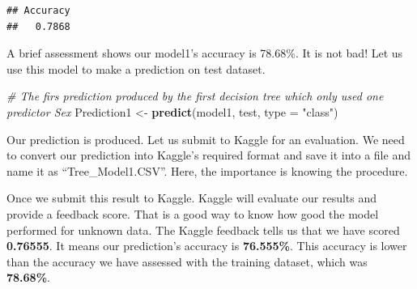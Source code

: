 \documentclass[
]{book}
\newenvironment{Shaded}{\begin{snugshade}}{\end{snugshade}}
\newcommand{\CommentTok}[1]{\textcolor[rgb]{0.56,0.35,0.01}{\textit{#1}}}
\newcommand{\DataTypeTok}[1]{\textcolor[rgb]{0.13,0.29,0.53}{#1}}
\newcommand{\KeywordTok}[1]{\textcolor[rgb]{0.13,0.29,0.53}{\textbf{#1}}}
\newcommand{\NormalTok}[1]{#1}
\newcommand{\OperatorTok}[1]{\textcolor[rgb]{0.81,0.36,0.00}{\textbf{#1}}}
\newcommand{\OtherTok}[1]{\textcolor[rgb]{0.56,0.35,0.01}{#1}}
\newcommand{\StringTok}[1]{\textcolor[rgb]{0.31,0.60,0.02}{#1}}
\begin{document}
\begin{Shaded}
\end{Shaded}

\begin{verbatim}
## Accuracy 
##   0.7868
\end{verbatim}

A brief assessment shows our model1's accuracy is 78.68\%. It is not bad! Let us use this model to make a prediction on test dataset.

\begin{Shaded}
\begin{Highlighting}[]
\CommentTok{# The firs prediction produced by the first decision tree which only used one predictor Sex}
\NormalTok{Prediction1 <-}\StringTok{ }\KeywordTok{predict}\NormalTok{(model1, test, }\DataTypeTok{type =} \StringTok{"class"}\NormalTok{)}
\end{Highlighting}
\end{Shaded}

Our prediction is produced. Let us submit to Kaggle for an evaluation. We need to convert our prediction into Kaggle's required format and save it into a file and name it as ``Tree\_Model1.CSV''. Here, the importance is knowing the procedure.

\begin{Shaded}
\end{Shaded}

Once we submit this result to Kaggle. Kaggle will evaluate our results and provide a feedback score. That is a good way to know how good the model performed for unknown data. The Kaggle feedback tells us that we have scored \textbf{0.76555}. It means our prediction's accuracy is \textbf{76.555\%}. This accuracy is lower than the accuracy we have assessed with the training dataset, which was \textbf{78.68\%}.
\end{document}
